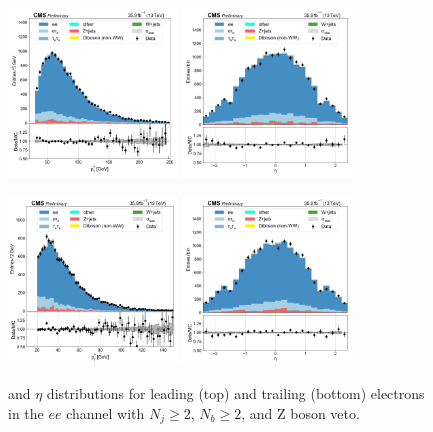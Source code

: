 \begin{figure}[htb!]
    \centering
    \includegraphics[width=0.4\textwidth]{chapters/Analysis/sectionPlots/figures/data_mc_overlays/ee_2016_cat_gt2_gt2_b_signal_linear_lepton_lepton1_pt}
    \includegraphics[width=0.4\textwidth]{chapters/Analysis/sectionPlots/figures/data_mc_overlays/ee_2016_cat_gt2_gt2_b_signal_linear_lepton_lepton1_eta}

    \includegraphics[width=0.4\textwidth]{chapters/Analysis/sectionPlots/figures/data_mc_overlays/ee_2016_cat_gt2_gt2_b_signal_linear_lepton_lepton2_pt}
    \includegraphics[width=0.4\textwidth]{chapters/Analysis/sectionPlots/figures/data_mc_overlays/ee_2016_cat_gt2_gt2_b_signal_linear_lepton_lepton2_eta}
    \caption{\pt and $\eta$ distributions for leading (top) and trailing
    (bottom) electrons in the $ee$ channel with $N_{j} \geq 2$, $N_{b}
    \geq 2$, and Z boson veto.}
    \label{fig:analysis:plots:ee_2_kinematic}
\end{figure}

